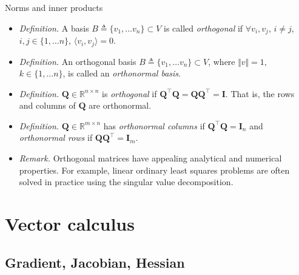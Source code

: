 \documentclass{beamer}
\numberwithin{equation}{section}
\begin{document}
\begin{frame}{Norms and inner products}
    \begin{itemize}
        \item
        \textit{Definition.} A basis $ B \triangleq \{v_1, \ldots v_n\} \subset
        V $ is called \textit{orthogonal}
        if $ \forall v_i, v_j $, $ i \ne j $, $ i, j \in \{1, \ldots n\} $,
        $ \langle v_i, v_j\rangle = 0 $.

        \item
        \textit{Definition.} An orthogonal basis $ B \triangleq
        \{v_1, \ldots v_n\} \subset V $, where $ \Vert v\Vert = 1 $,
        $ k \in \{1, \ldots n\} $, is called an \textit{orthonormal basis}.

        \item
        \textit{Definition.} $ \mathbf{Q} \in \mathbb{R}^{n \times n} $ is
        \textit{orthogonal}\footnotemark{} if $ \mathbf{Q}^\top\mathbf{Q} = \mathbf{QQ}^\top
        = \mathbf{I} $. That is, the rows and columns of $ \mathbf{Q} $ are
        orthonormal.

        \item
        \textit{Definition.} $ \mathbf{Q} \in \mathbb{R}^{m \times n} $ has
        \textit{orthonormal columns} if $ \mathbf{Q}^\top\mathbf{Q} =
        \mathbf{I}_n $ and \textit{orthonormal rows} if $ \mathbf{QQ}^\top =
        \mathbf{I}_m $.

        \item
        \textit{Remark.} Orthogonal matrices have appealing analytical and
        numerical properties. For example, linear ordinary least squares
        problems are often solved in practice using the singular value
        decomposition\footnotemark{}.
    \end{itemize}
\end{frame}

\section{Vector calculus}

\subsection{Gradient, Jacobian, Hessian}
\end{document}

